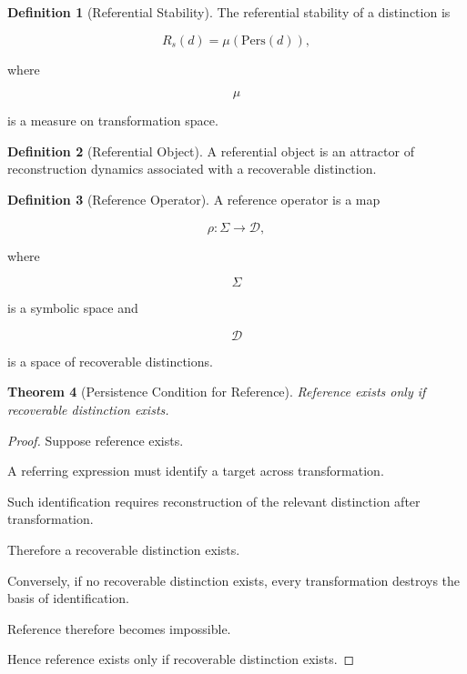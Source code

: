 \documentclass[12pt,oneside]{article}
\newtheorem{theorem}{Theorem}[section] \newtheorem{lemma}[theorem]{Lemma} \newtheorem{proposition}[theorem]{Proposition} \newtheorem{corollary}[theorem]{Corollary}
\theoremstyle{definition}
\newtheorem{definition}[theorem]{Definition} \newtheorem{axiom}[theorem]{Axiom} \newtheorem{remark}[theorem]{Remark} \newtheorem{example}[theorem]{Example}
\begin{document}
\begin{definition}[Referential Stability]

The referential stability of a distinction is

\[
R_s(d)
=
\mu(\mathrm{Pers}(d)),
\]

where

\[
\mu
\]

is a measure on transformation space.

\end{definition}

\begin{definition}[Referential Object]

A referential object is an attractor of reconstruction dynamics associated with a recoverable distinction.

\end{definition}

\begin{definition}[Reference Operator]

A reference operator is a map

\[
\rho :
\Sigma
\rightarrow
\mathcal D,
\]

where

\[
\Sigma
\]

is a symbolic space and

\[
\mathcal D
\]

is a space of recoverable distinctions.

\end{definition}

\begin{theorem}[Persistence Condition for Reference]

Reference exists only if recoverable distinction exists.

\end{theorem}

\begin{proof}

Suppose reference exists.

A referring expression must identify a target across transformation.

Such identification requires reconstruction of the relevant distinction after transformation.

Therefore a recoverable distinction exists.

Conversely, if no recoverable distinction exists, every transformation destroys the basis of identification.

Reference therefore becomes impossible.

Hence reference exists only if recoverable distinction exists.

\end{proof}
\end{document}
